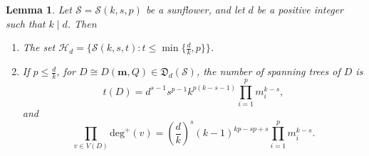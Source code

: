 \documentclass{article}
\newtheorem{lem}[thm]{Lemma}
\begin{document}
\begin{lem}\label{yinli3.5}
Let $\mathcal{S}=\mathcal{S}(k,s,p)$ be a sunflower, and let $d$ be a positive integer such that $k \mid d$. Then
\begin{enumerate}
\renewcommand{\labelenumi}{(\alph{enumi})}

\item The set $\mathcal{H}_d=\{\mathcal{S}(k,s,t): t\leq \min\{\frac{d}{k},p\}\}$.

\item If $p \leq \frac{d}{k}$, for $ D \cong D(\mathbf{m},Q) \in \mathfrak{D}_d(\mathcal{S})$, the number of spanning trees of $D$ is $$t(D)=d^{s-1}s^{p-1}k^{p(k-s-1)}\prod_{i=1}^{p}m_{i}^{k-s},$$
and
$$\prod_{v\in V(D)}\mathrm{deg}^{+}(v)=(\frac{d}{k})^s(k-1)^{kp-sp+s}\prod_{i=1}^{p}m_{i}^{k-s}.$$


\end{enumerate}
\end{lem}
\end{document}
